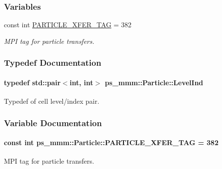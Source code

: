 \subsubsection*{Variables}
\begin{DoxyCompactItemize}
\item 
const int \hyperlink{namespaceps__mmm_1_1_particle_aba5c697d9642a912ed4f0e5ce047f8ad}{P\+A\+R\+T\+I\+C\+L\+E\+\_\+\+X\+F\+E\+R\+\_\+\+T\+A\+G} = 382
\begin{DoxyCompactList}\small\item\em M\+P\+I tag for particle transfers. \end{DoxyCompactList}\end{DoxyCompactItemize}


\subsubsection{Typedef Documentation}
\hypertarget{namespaceps__mmm_1_1_particle_a475174140997ceb63cc9e801b6c0c4b8}{}
\paragraph[{Level\+Ind}]{\setlength{\rightskip}{0pt plus 5cm}typedef std\+::pair$<$int, int$>$ {\bf ps\+\_\+mmm\+::\+Particle\+::\+Level\+Ind}}\label{namespaceps__mmm_1_1_particle_a475174140997ceb63cc9e801b6c0c4b8}


Typedef of cell level/index pair. 



\subsubsection{Variable Documentation}
\hypertarget{namespaceps__mmm_1_1_particle_aba5c697d9642a912ed4f0e5ce047f8ad}{}
\paragraph[{P\+A\+R\+T\+I\+C\+L\+E\+\_\+\+X\+F\+E\+R\+\_\+\+T\+A\+G}]{\setlength{\rightskip}{0pt plus 5cm}const int ps\+\_\+mmm\+::\+Particle\+::\+P\+A\+R\+T\+I\+C\+L\+E\+\_\+\+X\+F\+E\+R\+\_\+\+T\+A\+G = 382}\label{namespaceps__mmm_1_1_particle_aba5c697d9642a912ed4f0e5ce047f8ad}


M\+P\+I tag for particle transfers. 

